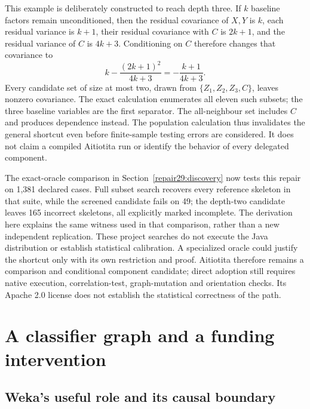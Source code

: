 This example is deliberately constructed to reach depth three. If \(k\)
baseline factors remain unconditioned, then the residual covariance of
\(X,Y\) is \(k\), each residual variance is \(k+1\), their residual
covariance with \(C\) is \(2k+1\), and the residual variance of \(C\) is
\(4k+3\). Conditioning on \(C\) therefore changes that covariance to \[
 k-\frac{(2k+1)^2}{4k+3}=-\frac{k+1}{4k+3}.
\] Every candidate set of size at most two, drawn from
\(\{Z_1,Z_2,Z_3,C\}\), leaves nonzero covariance. The exact calculation
enumerates all eleven such subsets; the three baseline variables are the
first separator. The all-neighbour set includes \(C\) and produces
dependence instead. The population calculation thus invalidates the
general shortcut even before finite-sample testing errors are
considered. It does not claim a compiled Aitiotita run or identify the
behavior of every delegated component.
\citep{exec13_java_examples,exec13_java_aitiotita}

The exact-oracle comparison in Section~\ref{repair29:discovery} now tests
this repair on 1,381 declared cases. Full subset search recovers every
reference skeleton in that suite, while the screened candidate fails on 49;
the depth-two candidate leaves 165 incorrect skeletons, all explicitly
marked incomplete. The derivation here explains the same witness used in
that comparison, rather than a new independent replication. These project
searches do not execute the Java distribution or establish statistical
calibration. A specialized oracle could justify the shortcut only with its
own restriction and proof. Aitiotita therefore remains a comparison and
conditional component candidate; direct adoption still requires native
execution, correlation-test, graph-mutation and orientation checks. Its
Apache 2.0 license
does not establish the statistical correctness of the path.
\citep{exec13_java_aitiotita}

\hypertarget{a-classifier-graph-and-a-funding-intervention}{%
\section{A classifier graph and a funding
intervention}\label{a-classifier-graph-and-a-funding-intervention}}

\hypertarget{wekas-useful-role-and-its-causal-boundary}{%
\subsection{Weka's useful role and its causal
boundary}\label{wekas-useful-role-and-its-causal-boundary}}

